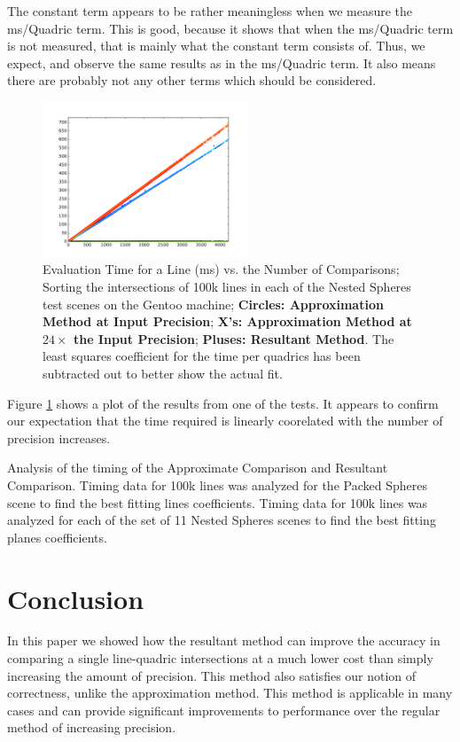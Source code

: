 \documentclass{cccg16}
\begin{document}
The constant term appears to be rather meaningless when we measure the
ms/Quadric term.  This is good, because it shows that when the
ms/Quadric term is not measured, that is mainly what the constant term
consists of.  Thus, we expect, and observe the same results as in the
ms/Quadric term.  It also means there are probably not any other terms
which should be considered.

\begin{figure}
  \includegraphics[width=0.55\textwidth]{imgs/hardEllipsoidsSingle_gentoo_adjusted.png}
  \caption{Evaluation Time for a Line (ms) vs. the Number of
    Comparisons; Sorting the intersections of 100k lines in each of
    the Nested Spheres test scenes on the Gentoo machine; {\bf
      Circles: Approximation Method at Input Precision}; {\bf X's:
      Approximation Method at $24\times$ the Input Precision}; {\bf
      Pluses: Resultant Method}.  The least squares coefficient for
    the time per quadrics has been subtracted out to better show the
    actual fit.}
  \label{fig:linefit}
\end{figure}

Figure \ref{fig:linefit} shows a plot of the results from one of the
tests.  It appears to confirm our expectation that the time required
is linearly coorelated with the number of precision increases.

\begin{table}
  \caption{Analysis of the timing of the Approximate Comparison and
    Resultant Comparison.  Timing data for 100k lines was analyzed for
    the Packed Spheres scene to find the best fitting lines
    coefficients.  Timing data for 100k lines was analyzed for each of
    the set of 11 Nested Spheres scenes to find the best fitting
    planes coefficients.}
  \label{tab:times}
  
\end{table}

\section{Conclusion}
In this paper we showed how the resultant method can improve the
accuracy in comparing a single line-quadric intersections at a much
lower cost than simply increasing the amount of precision.  This
method also satisfies our notion of correctness, unlike the
approximation method.  This method is applicable in many cases and can
provide significant improvements to performance over the regular
method of increasing precision.
\end{document}

